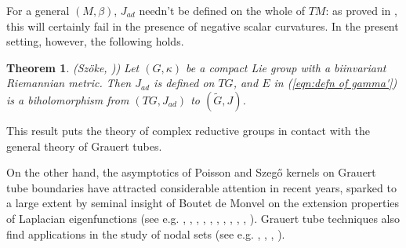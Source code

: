 \documentclass[12pt,a4paper]{article}
\theoremstyle{plain}
\newtheorem{thm}{Theorem}[section]
\theoremstyle{definition}
\begin{document}
For a general $(M,\beta)$, $J_{ad}$ needn't 
be defined on the whole of $TM$: as proved in 
\cite{ls},
this will certainly fail in the presence of negative scalar curvatures.
In the present setting, however, the following holds.

\begin{thm}
\label{thm:szoke compgr}
(Sz\"{o}ke, \cite{szo98}))
Let $(G,\kappa)$ be a compact Lie group with a biinvariant Riemannian metric.
Then $J_{ad}$ is defined on $TG$, and $E$ in
(\ref{eqn:defn of gamma'}) is a biholomorphism from $(TG,J_{ad})$ to
$(\tilde{G},J)$.


\end{thm}

This result puts the theory of complex reductive groups
in contact with the general theory of Grauert tubes.

On the other hand, the asymptotics of Poisson and Szeg\H{o} kernels
on Grauert tube boundaries have attracted considerable
attention in recent years, 
sparked to a large extent by seminal insight of
Boutet de Monvel on the extension properties of
Laplacian eigenfunctions
(see e.g. \cite{bdm1}, \cite{cr1}, \cite{cr2},
\cite{gls},
\cite{g},
\cite{leb}, 
\cite{s1}, \cite{s2},
\cite{z12}, \cite{z13}, \cite{z20}).
Grauert tube techniques also find applications in the
study of nodal sets (see e.g. 
\cite{ct16}, \cite{ct18}, \cite{tz09}, \cite{tz21}). 
\end{document}
